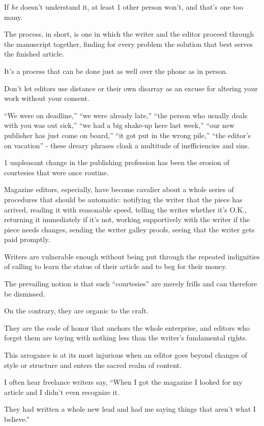 \documentclass{book}
\numberwithin{equation}{section}
\begin{document}
If \textit{he} doesn't understand it, at least 1 other person won't, and that's one too many.

The process, in short, is one in which the writer and the editor proceed through the manuscript together, finding for every problem the solution that best serves the finished article.

%
It's a process that can be done just as well over the phone as in person.

Don't let editors use distance or their own disarray as an excuse for altering your work without your consent.

``We were on deadline,'' ``we were already late,'' ``the person who usually deals with you was out sick,'' ``we had a big shake-up here last week,'' ``our new publisher has just come on board,'' ``it got put in the wrong pile,'' ``the editor's on vacation'' - these dreary phrases cloak a multitude of inefficiencies and sins.

1 unpleasant change in the publishing profession has been the erosion of courtesies that were once routine.

Magazine editors, especially, have become cavalier about a whole series of procedures that should be automatic: notifying the writer that the piece has arrived, reading it with reasonable speed, telling the writer whether it's O.K., returning it immediately if it's not, working supportively with the writer if the piece needs changes, sending the writer galley proofs, seeing that the writer gets paid promptly.

Writers are vulnerable enough without being put through the repeated indignities of calling to learn the status of their article and to beg for their money.

%
The prevailing notion is that such ``courtesies'' are merely frills and can therefore be dismissed.

On the contrary, they are organic to the craft.

They are the code of honor that anchors the whole enterprise, and editors who forget them are toying with nothing less than the writer's fundamental rights.

%
This arrogance is at its most injurious when an editor goes beyond changes of style or structure and enters the sacred realm of content.

I often hear freelance writers say, ``When I got the magazine I looked for my article and I didn't even recognize it.

They had written a whole new lead and had me saying things that aren't what I believe.''
\end{document}

